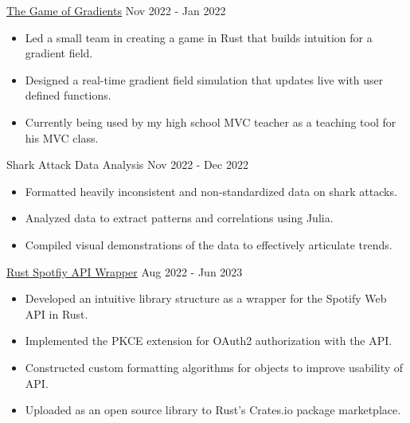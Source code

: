 \documentclass[9pt]{resume}
\begin{document}
    \vspace{-0.4cm}
    \begin{experiencelist}
        \experiencenocompany
            {\href{https://github.com/TheSharkhead2/The_Game_of_Gradients}{The Game of Gradients}}
            {Nov 2022 - Jan 2022}
            {\begin{itemize}[noitemsep, topsep=1pt] 
                \item Led a small team in creating a game in Rust that builds intuition for a gradient field.
                \item Designed a real-time gradient field simulation that updates live with user defined functions. 
                \item Currently being used by my high school MVC teacher as a teaching tool for his MVC class. 
            \end{itemize}}
        \experiencenocompany 
            {Shark Attack Data Analysis}
            {Nov 2022 - Dec 2022}
            {\begin{itemize}[noitemsep, topsep=1pt]
                \item Formatted heavily inconsistent and non-standardized data on shark attacks.
                \item Analyzed data to extract patterns and correlations using Julia. 
                \item Compiled visual demonstrations of the data to effectively articulate trends. 
            \end{itemize}}
        \experiencenocompany
            {\href{https://github.com/TheSharkhead2/spotify.rs}{Rust Spotfiy API Wrapper}}
            {Aug 2022 - Jun 2023}
            {\begin{itemize}[noitemsep, topsep=1pt]
                \item Developed an intuitive library structure as a wrapper for the Spotify Web API in Rust. 
                \item Implemented the PKCE extension for OAuth2 authorization with the API. 
                \item Constructed custom formatting algorithms for objects to improve usability of API.
                \item Uploaded as an open source library to Rust's Crates.io package marketplace.
            \end{itemize}}

\end{experiencelist}
\end{document}
